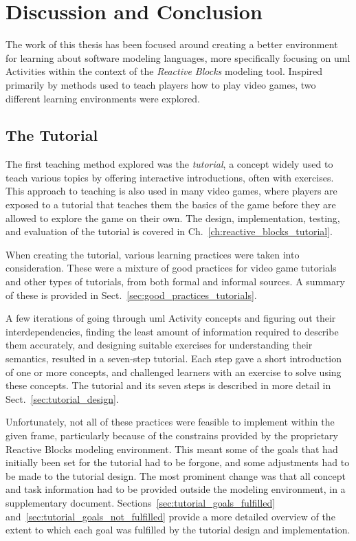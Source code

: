 \chapter{Discussion and Conclusion}
\label{ch:discussion}
The work of this thesis has been focused around creating a better environment for learning about software modeling languages, more specifically focusing on \gls{uml} Activities within the context of the \emph{Reactive Blocks} modeling tool. Inspired primarily by methods used to teach players how to play video games, two different learning environments were explored.

\section{The Tutorial}
\label{sec:discussion_tutorial}
The first teaching method explored was the \emph{tutorial}, a concept widely used to teach various topics by offering interactive introductions, often with exercises. This approach to teaching is also used in many video games, where players are exposed to a tutorial that teaches them the basics of the game before they are allowed to explore the game on their own. The design, implementation, testing, and evaluation of the tutorial is covered in Ch.~\ref{ch:reactive_blocks_tutorial}.

\noindent
When creating the tutorial, various learning practices were taken into consideration. These were a mixture of good practices for video game tutorials and other types of tutorials, from both formal and informal sources. A summary of these is provided in Sect.~\ref{sec:good_practices_tutorials}.

\noindent
A few iterations of going through \gls{uml} Activity concepts and figuring out their interdependencies, finding the least amount of information required to describe them accurately, and designing suitable exercises for understanding their semantics, resulted in a seven-step tutorial. Each step gave a short introduction of one or more concepts, and challenged learners with an exercise to solve using these concepts. The tutorial and its seven steps is described in more detail in Sect.~\ref{sec:tutorial_design}.

\noindent
Unfortunately, not all of these practices were feasible to implement within the given frame, particularly because of the constrains provided by the proprietary Reactive Blocks modeling environment. This meant some of the goals that had initially been set for the tutorial had to be forgone, and some adjustments had to be made to the tutorial design. The most prominent change was that all concept and task information had to be provided outside the modeling environment, in a supplementary document. Sections~\ref{sec:tutorial_goals_fulfilled} and~\ref{sec:tutorial_goals_not_fulfilled} provide a more detailed overview of the extent to which each goal was fulfilled by the tutorial design and implementation.

